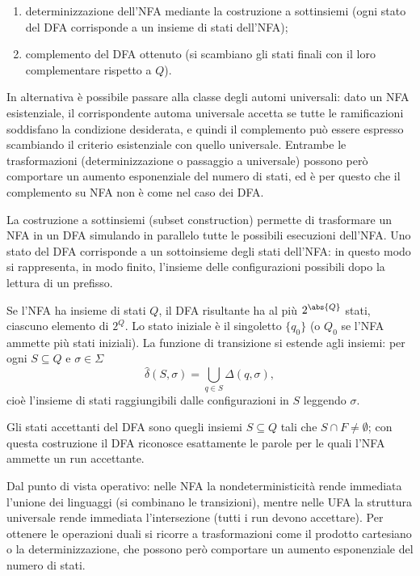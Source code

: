 \begin{enumerate}
  \item determinizzazione dell'NFA mediante la costruzione a sottinsiemi (ogni stato del DFA corrisponde a un insieme di stati dell'NFA);
  \item complemento del DFA ottenuto (si scambiano gli stati finali con il loro complementare rispetto a \(Q\)).
\end{enumerate}

In alternativa è possibile passare alla classe degli automi universali: dato un NFA esistenziale, il corrispondente automa universale accetta se tutte le ramificazioni soddisfano la condizione desiderata, e quindi il complemento può essere espresso scambiando il criterio esistenziale con quello universale. Entrambe le trasformazioni (determinizzazione o passaggio a universale) possono però comportare un aumento esponenziale del numero di stati, ed è per questo che il complemento su NFA non è  come nel caso dei DFA\@.

La costruzione a sottinsiemi (subset construction) permette di trasformare un NFA in un DFA simulando in parallelo tutte le possibili esecuzioni dell'NFA\@. Uno stato del DFA corrisponde a un sottoinsieme degli stati dell'NFA\@: in questo modo si rappresenta, in modo finito, l'insieme delle configurazioni possibili dopo la lettura di un prefisso.

Se l'NFA ha insieme di stati \(Q\), il DFA risultante ha al più \(2^{\abs{Q}}\) stati, ciascuno elemento di \(2^{Q}\). Lo stato iniziale è il singoletto \(\{q_0\}\) (o \(Q_0\) se l'NFA ammette più stati iniziali). La funzione di transizione si estende agli insiemi: per ogni \(S\subseteq Q\) e \(\sigma\in\Sigma\)
\[
  \hat{\delta}(S,\sigma)=\bigcup_{q\in S}\Delta(q,\sigma),
\]
cioè l'insieme di stati raggiungibili dalle configurazioni in \(S\) leggendo \(\sigma\).

Gli stati accettanti del DFA sono quegli insiemi \(S\subseteq Q\) tali che \(S\cap F\neq\emptyset\); con questa costruzione il DFA riconosce esattamente le parole per le quali l'NFA ammette un run accettante.

Dal punto di vista operativo: nelle NFA la nondeterministicità rende immediata l'unione dei linguaggi (si combinano le transizioni), mentre nelle UFA la struttura universale rende immediata l'intersezione (tutti i run devono accettare). Per ottenere le operazioni duali si ricorre a trasformazioni come il prodotto cartesiano o la determinizzazione, che possono però comportare un aumento esponenziale del numero di stati.

